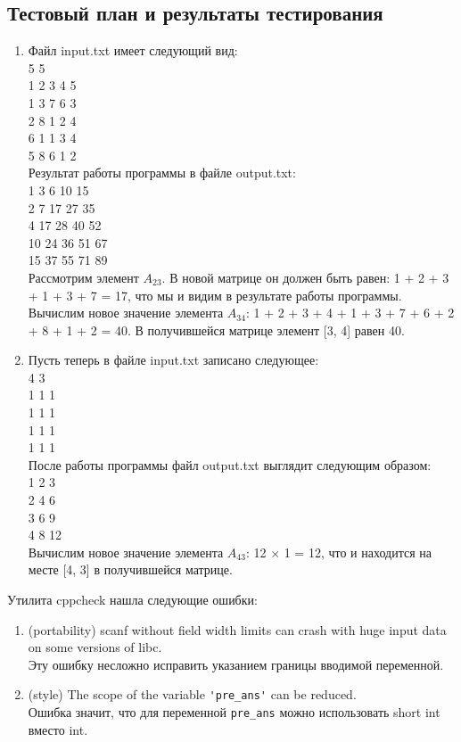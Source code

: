 \documentclass[12pt,a4paper]{report}
\begin{document}
\subsection{Тестовый план и результаты тестирования}
\begin{enumerate}
\item Файл input.txt имеет следующий вид: \\
5 5 \\
1 2 3 4 5 \\
1 3 7 6 3 \\
2 8 1 2 4 \\
6 1 1 3 4 \\
5 8 6 1 2 \\
Результат работы программы в файле output.txt:\\
1 3 6 10 15 \\
2 7 17 27 35 \\
4 17 28 40 52 \\
10 24 36 51 67 \\
15 37 55 71 89 \\
Рассмотрим элемент $A_{2 3}$. В новой матрице он должен быть равен: 1 + 2 + 3 + 1 + 3 + 7 = 17, что мы и видим в результате работы программы. Вычислим новое значение элемента $A_{3 4}$: 1 + 2 + 3 + 4 + 1 + 3 + 7 + 6 + 2 + 8 + 1 + 2 = 40. В получившейся матрице элемент [3, 4] равен 40. 
\item Пусть теперь в файле input.txt записано следующее: \\
4 3 \\
1 1 1 \\
1 1 1 \\
1 1 1 \\
1 1 1 \\
После работы программы файл output.txt выглядит следующим образом: \\
1 2 3 \\
2 4 6 \\
3 6 9 \\
4 8 12 \\
Вычислим новое значение элемента $A_{4 3}$: 12 $\times$ 1 = 12, что и находится на месте [4, 3] в получившейся матрице. 
\end{enumerate} 
Утилита cppcheck нашла следующие ошибки: \\
\begin{enumerate}
\item (portability) scanf without field width limits can crash with huge input data on some versions of libc. \\
Эту ошибку несложно исправить указанием границы вводимой переменной.
\item (style) The scope of the variable \verb+'pre_ans'+ can be reduced.\\
Ошибка значит, что для переменной \verb+pre_ans+ можно использовать short int вместо int. 
\end{enumerate}
\end{document}
